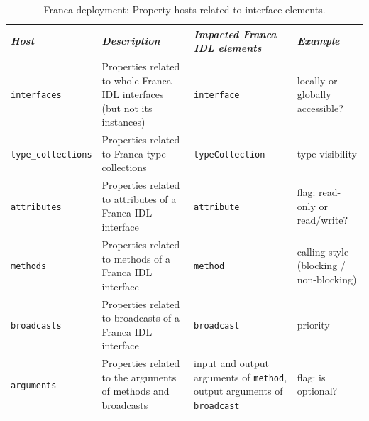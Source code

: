 \documentclass[a4paper,10pt]{scrreprt}
\newlength{\XdocTEffectiveWidth}
\begin{document}
\begin{table}
\setlength{\XdocTEffectiveWidth}{\textwidth}
\addtolength{\XdocTEffectiveWidth}{-8.0\tabcolsep}
\noindent\begin{tabular}{p{0.13\XdocTEffectiveWidth}p{0.38\XdocTEffectiveWidth}p{0.25\XdocTEffectiveWidth}p{0.25\XdocTEffectiveWidth}}
\toprule
\textit{Host}

 & \textit{Description}

 & \textit{Impacted Franca IDL elements}

 & \textit{Example}

\\
\midrule
\protect\lstinline[language=FDeploy]�interfaces�

 & Properties related to whole Franca IDL interfaces (but not its instances)

 & \protect\lstinline[language=Franca]�interface�

 & locally or globally accessible?

\\
\protect\lstinline[language=FDeploy]�type_collections�

 & Properties related to Franca type collections

 & \protect\lstinline[language=Franca]�typeCollection�

 & type visibility

\\
\protect\lstinline[language=FDeploy]�attributes�

 & Properties related to attributes of a Franca IDL interface

 & \protect\lstinline[language=Franca]�attribute�

 & flag: read-only or read/write?

\\
\protect\lstinline[language=FDeploy]�methods�

 & Properties related to methods of a Franca IDL interface

 & \protect\lstinline[language=Franca]�method�

 & calling style (blocking / non-blocking)

\\
\protect\lstinline[language=FDeploy]�broadcasts�

 & Properties related to broadcasts of a Franca IDL interface

 & \protect\lstinline[language=Franca]�broadcast�

 & priority

\\
\protect\lstinline[language=FDeploy]�arguments�

 & Properties related to the arguments of methods and broadcasts

 & input and output arguments of \protect\lstinline[language=Franca]�method�, output arguments of \protect\lstinline[language=Franca]�broadcast�

 & flag: is optional?

\\
\bottomrule
\end{tabular}
\caption{Franca deployment: Property hosts related to interface elements.}
\label{DeploymentInterfaceHostsPart1}
\end{table}
\end{document}
